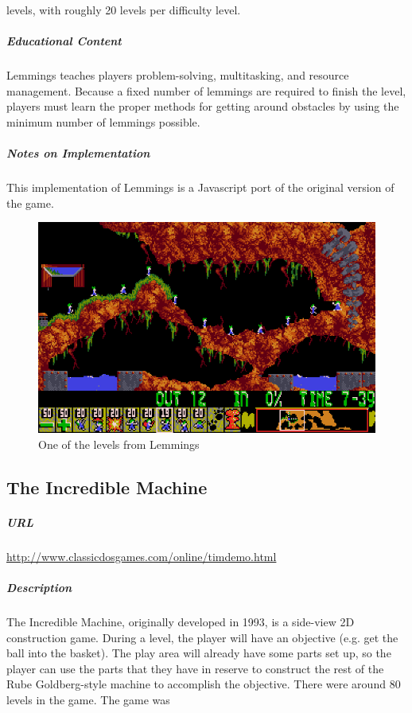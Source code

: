levels, with roughly 20 levels per difficulty level.\subparagraph{Educational Content}Lemmings teaches players problem-solving, multitasking, and resource management. Because a fixed number of lemmings are required to finish the level, players must learn the proper methods for getting around obstacles by using the minimum number of lemmings possible.\subparagraph{Notes on Implementation}This implementation of Lemmings is a Javascript port of the original version of the game.\begin{figure}[p]\centering \includegraphics[height=.4\textheight, width=\textwidth, keepaspectratio=true]{img/lemmings_screen.jpg}\caption{One of the levels from Lemmings}\end{figure}\subsection{The Incredible Machine}\subparagraph{URL}\url{http://www.classicdosgames.com/online/timdemo.html}\subparagraph{Description}The Incredible Machine, originally developed in 1993, is a side-view 2D construction game. During a level, the player will have an objective (e.g. get the ball into the basket). The play area will already have some parts set up, so the player can use the parts that they have in reserve to construct the rest of the Rube Goldberg-style machine to accomplish the objective. There were around 80 levels in the game. The game was 